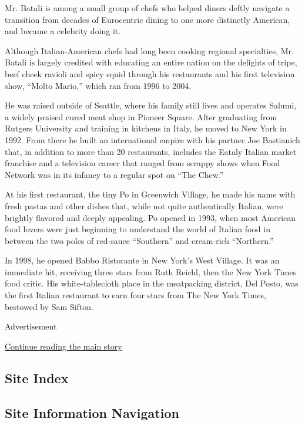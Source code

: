 Mr. Batali is among a small group of chefs who helped diners deftly
navigate a transition from decades of Eurocentric dining to one more
distinctly American, and became a celebrity doing it.

Although Italian-American chefs had long been cooking regional
specialties, Mr. Batali is largely credited with educating an entire
nation on the delights of tripe, beef cheek ravioli and spicy squid
through his restaurants and his first television show, ``Molto Mario,''
which ran from 1996 to 2004.

He was raised outside of Seattle, where his family still lives and
operates Salumi, a widely praised cured meat shop in Pioneer Square.
After graduating from Rutgers University and training in kitchens in
Italy, he moved to New York in 1992. From there he built an
international empire with his partner Joe Bastianich that, in addition
to more than 20 restaurants, includes the Eataly Italian market
franchise and a television career that ranged from scrappy shows when
Food Network was in its infancy to a regular spot on ``The Chew.''

At his first restaurant, the tiny Po in Greenwich Village, he made his
name with fresh pastas and other dishes that, while not quite
authentically Italian, were brightly flavored and deeply appealing. Po
opened in 1993, when most American food lovers were just beginning to
understand the world of Italian food in between the two poles of
red-sauce ``Southern'' and cream-rich ``Northern.''

In 1998, he opened Babbo Ristorante in New York's West Village. It was
an immediate hit, receiving three stars from Ruth Reichl, then the New
York Times food critic. His white-tablecloth place in the meatpacking
district, Del Posto, was the first Italian restaurant to earn four stars
from The New York Times, bestowed by Sam Sifton.

Advertisement

\protect\hyperlink{after-bottom}{Continue reading the main story}

\hypertarget{site-index}{%
\subsection{Site Index}\label{site-index}}

\hypertarget{site-information-navigation}{%
\subsection{Site Information
Navigation}\label{site-information-navigation}}

